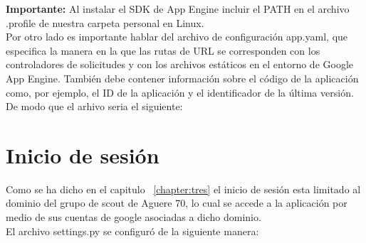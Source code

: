 \textbf{Importante:} Al instalar el SDK de App Engine incluir el PATH en el archivo .profile de nuestra carpeta personal en Linux.\\

Por otro lado es importante hablar del archivo de configuración app.yaml, que especifica la manera en la que las rutas de URL se corresponden con los 
controladores de solicitudes y con los archivos estáticos en el entorno de Google App Engine. 
También debe contener información sobre el código de la aplicación como, por ejemplo, el ID de la aplicación y el identificador de la última versión.\\

De modo que el arhivo seria el siguiente:\\



\section{Inicio de sesión}
\label{4:sec4}

Como se ha dicho en el capitulo ~\ref{chapter:tres} el inicio de sesión esta limitado al dominio del grupo de scout de Aguere 70, lo cual se accede a la aplicación
por medio de sus cuentas de google asociadas a dicho dominio.\\

El archivo settings.py se configuró de la siguiente manera:\\






